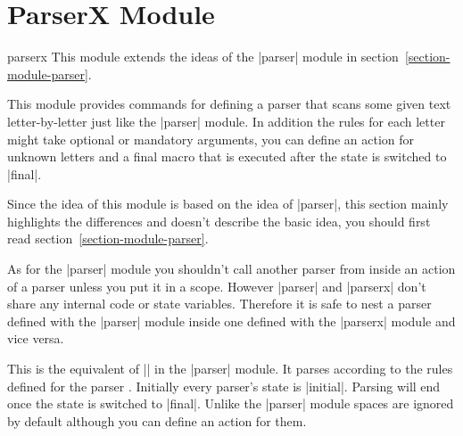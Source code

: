 %
%
%

\section{ParserX Module}
\label{section-module-parserx}

\begin{pgfmodule}{parserx}
  This module extends the ideas of the |parser| module in
  section~\ref{section-module-parser}.
\end{pgfmodule}

This module provides commands for defining a parser that scans some given text
letter-by-letter just like the |parser| module. In addition the rules for each
letter might take optional or mandatory arguments, you can define an action for
unknown letters and a final macro that is executed after the state is
switched to |final|.

Since the idea of this module is based on the idea of |parser|, this section
mainly highlights the differences and doesn't describe the basic idea, you
should first read section~\ref{section-module-parser}.

As for the |parser| module you shouldn't call another parser from inside an
action of a parser unless you put it in a scope. However |parser| and |parserx|
don't share any internal code or state variables. Therefore it is safe to nest a
parser defined with the |parser| module inside one defined with the |parserx|
module and vice versa.

\begin{command}{\pgfparserxrun{}}
  This is the equivalent of |\pgfparserparse| in the |parser| module. It parses
   according to the rules defined for the parser .
  Initially every parser's state is |initial|. Parsing will end once the state
  is switched to |final|. Unlike the |parser| module spaces are ignored by
  default although you can define an action for them.
\end{command}

